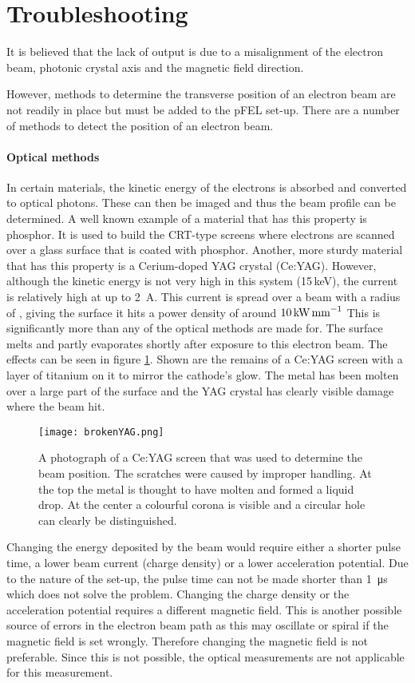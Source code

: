 \section{Troubleshooting}
It is believed that the lack of output is due to a misalignment of the electron beam, photonic crystal axis and the magnetic field direction.

However, methods to determine the transverse position of an electron beam are not readily in place but must be added to the pFEL set-up. 
There are a number of methods to detect the position of an electron beam.

\paragraph{Optical methods}
In certain materials, the kinetic energy of the electrons is absorbed and converted to optical photons.  These can then be imaged and thus the beam profile can be determined. A well known example of a material that has this property is phosphor. It is used to build the CRT-type screens where electrons are scanned over a glass surface that is coated with phosphor.
Another, more sturdy material that has this property is a Cerium-doped YAG crystal (Ce:YAG). 
However, although the kinetic energy is not very high in this system (15\,keV), the current is relatively high at up to \SI{2}{\ampere}. This current is spread over a beam with a radius of , giving the surface it hits a power density of around $10\,\text{kW\,mm}^{-1}$
This is significantly more than any of the optical methods are made for. The surface melts and partly evaporates shortly after exposure to this electron beam. 
The effects can be seen in figure \ref{fig:brokenyag}. Shown are the remains of a Ce:YAG screen with a layer of titanium on it to mirror the cathode's glow. The metal has been molten over a large part of the surface and the YAG crystal has clearly visible damage where the beam hit. 
\begin{figure}[h]
 \centering
 \texttt{[image: brokenYAG.png]}
 \caption{A photograph of a Ce:YAG screen that was used to determine the beam position. The scratches were caused by improper handling. At the top the metal is thought to have molten and formed a liquid drop. At the center a colourful corona is visible and a circular hole can clearly be distinguished.}
 \label{fig:brokenyag}
\end{figure}

Changing the energy deposited by the beam would require either a shorter pulse time, a lower beam current (charge density) or a lower acceleration potential.
Due to the nature of the set-up, the pulse time can not be made shorter than \SI{1}{\micro\second} which does not solve the problem. Changing the charge density or the acceleration potential requires a different magnetic field. 
This is another possible source of errors in the electron beam path as this may oscillate or spiral if the magnetic field is set wrongly. Therefore changing the magnetic field is not preferable.
Since this is not possible, the optical measurements are not applicable for this measurement.

